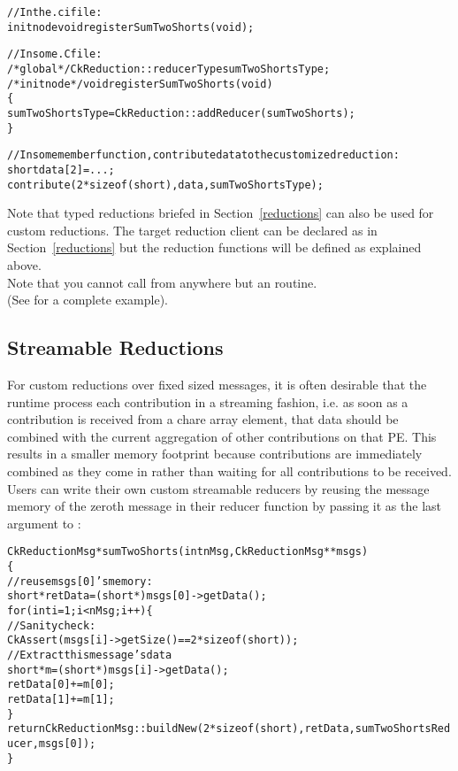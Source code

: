 \begin{alltt}
//In the .ci file:
  initnode void registerSumTwoShorts(void);

//In some .C file:
/*global*/ CkReduction::reducerType sumTwoShortsType;
/*initnode*/ void registerSumTwoShorts(void)
\{
  sumTwoShortsType=CkReduction::addReducer(sumTwoShorts);
\}

//In some member function, contribute data to the customized reduction:
  short data[2]=...;
  contribute(2*sizeof(short),data,sumTwoShortsType);
\end{alltt}
Note that typed reductions briefed in Section~\ref{reductions}
can also be used for custom reductions. The target reduction client 
can be declared as in Section~\ref{reductions} but the reduction functions
will be defined as explained above.\\
Note that you cannot call 
from anywhere but an  routine.\\
(See  for a complete example).


\subsection{Streamable Reductions}

\label{streamable_reductions}

For custom reductions over fixed sized messages, it is often desirable
that the runtime process each contribution in a streaming fashion,
i.e. as soon as a contribution is received from a chare array element,
that data should be combined with the current aggregation of other
contributions on that PE. This results in a smaller memory footprint
because contributions are immediately combined as they come in rather
than waiting for all contributions to be received. Users can write
their own custom streamable reducers by reusing the message memory of
the zeroth message in their reducer function by passing it as the last
argument to :

\begin{alltt}
CkReductionMsg *sumTwoShorts(int nMsg,CkReductionMsg **msgs)
\{
  // reuse msgs[0]'s memory:
  short *retData = (short*)msgs[0]->getData();
  for (int i=1;i<nMsg;i++) \{
    //Sanity check:
    CkAssert(msgs[i]->getSize()==2*sizeof(short));
    //Extract this message's data
    short *m=(short *)msgs[i]->getData();
    retData[0]+=m[0];
    retData[1]+=m[1];
  \}
  return CkReductionMsg::buildNew(2*sizeof(short), retData, sumTwoShortsReducer, msgs[0]);
\}
\end{alltt}

